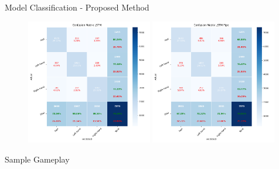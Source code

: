 \begin{frame}{Model Classification - Proposed Method}
    \begin{figure}[htpb!]
        \centering
        \includegraphics[width=0.49\textwidth]{figures/classification/confusion_matrix_lstm}
        \includegraphics[width=0.49\textwidth]{figures/classification/confusion_matrix_lstm_pipe}
    \end{figure}
\end{frame}

\begin{frame}{Sample Gameplay}
    \begin{figure}[htpb!]
        \centering
        \href{https://www.youtube.com}{%
        }
    \end{figure}
\end{frame}
